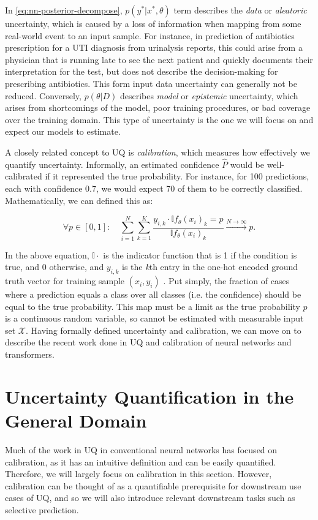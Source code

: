 In \eqref{eq:nn-posterior-decompose}, $p(y^{*}|x^{*},\theta)$ term describes the \emph{data} or \emph{aleatoric} uncertainty, which is caused by a loss of information when mapping from some real-world event to an input sample. For instance, in prediction of antibiotics prescription for a UTI diagnosis from urinalysis reports, this could arise from a physician that is running late to see the next patient and quickly documents their interpretation for the test, but does not describe the decision-making for prescribing antibiotics. This form input data uncertainty can generally not be reduced. Conversely, $p(\theta|D)$ describes \emph{model} or \emph{epistemic} uncertainty, which arises from shortcomings of the model, poor training procedures,  or bad coverage over the training domain. This type of uncertainty is the one we will focus on and expect our models to estimate. 

A closely related concept to UQ is \emph{calibration}, which measures how effectively we quantify uncertainty. Informally, an estimated confidence $\hat{P}$ would be well-calibrated if it represented the true probability. For instance, for 100 predictions, each with confidence 0.7, we would expect 70 of them to be correctly classified. Mathematically, we can defined this as: 

\begin{equation} \label{eq:calibration}
\forall p \in [0,1]: \quad \sum_{i=1}^{N}\sum_{k=1}^{K}\frac{y_{i,k}\cdot \mathbb{I}{f_{\theta}(x_i)_k = p}}{\mathbb{I}{f_{\theta}(x_i)_k}} \xrightarrow{N \rightarrow \infty} p.
\end{equation}

In the above equation, $\mathbb{I}{\cdot}$ is the indicator function that is 1 if the condition is true, and 0 otherwise, and $y_{i,k}$ is the \emph{k}th entry in the one-hot encoded ground truth vector for training sample $(x_i,y_i)$ \citep{gawlikowskiSurveyUncertaintyDeep2023, guoCalibrationModernNeural2017}. Put simply, the fraction of cases where a prediction equals a class over all classes (i.e. the confidence) should be equal to the true probability. This map must be a limit as the true probability $p$ is a continuous random variable, so cannot be estimated with measurable input set $\mathcal{X}$. Having formally defined uncertainty and calibration, we can move on to describe the recent work done in UQ and calibration of neural networks and transformers.

\section{Uncertainty Quantification in the General Domain}
Much of the work in UQ in conventional neural networks has focused on calibration, as it has an intuitive definition and can be easily quantified. Therefore, we will largely focus on calibration in this section. However, calibration can be thought of as a quantifiable prerequisite for downstream use cases of UQ, and so we will also introduce relevant downstream tasks such as selective prediction. 

